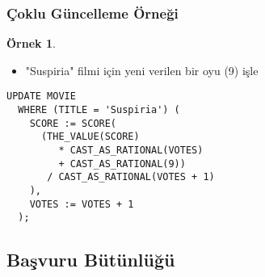 \documentclass[dvipsnames]{beamer}
\theoremstyle{definition}
\theoremstyle{example}
\newtheorem{ornek}[theorem]{Örnek}
\theoremstyle{plain}
\begin{document}
\begin{frame}[fragile]
  \frametitle{Çoklu Güncelleme Örneği}

  \begin{ornek}
    \begin{itemize}
      \item "Suspiria" filmi için yeni verilen bir oyu (9) işle
    \end{itemize}

    \begin{lstlisting}
UPDATE MOVIE
  WHERE (TITLE = 'Suspiria') (
    SCORE := SCORE(
      (THE_VALUE(SCORE)
         * CAST_AS_RATIONAL(VOTES)
         + CAST_AS_RATIONAL(9))
       / CAST_AS_RATIONAL(VOTES + 1)
    ),
    VOTES := VOTES + 1
  );
    \end{lstlisting}
  \end{ornek}
\end{frame}

\subsection{Başvuru Bütünlüğü}
\end{document}
